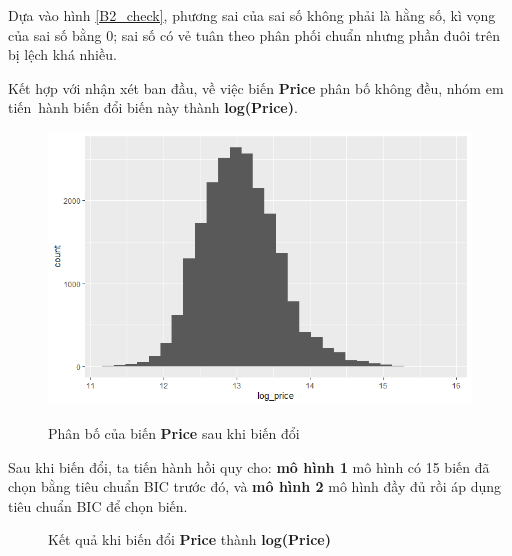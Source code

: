  Dựa vào hình \ref{B2_check}, phương sai của sai số không phải là hằng số, kì vọng của sai số bằng 0; sai số có vẻ tuân theo phân phối chuẩn nhưng phần đuôi trên bị lệch khá nhiều. 
 
 Kết hợp với nhận xét ban đầu, về việc biến \textbf{Price} phân bố không đều, nhóm em tiến~hành biến đổi biến này thành \textbf{log(Price)}.
 
 \begin{figure}[H]
 	\centering
 	{\includegraphics[width=.5\linewidth]{../Photo Of Result/B2_logprice}}
 	\caption{Phân bố của biến \textbf{Price} sau khi biến đổi }
 	\label{B2_log}
 \end{figure}
 Sau khi biến đổi, ta tiến hành hồi quy cho: \textbf{mô hình 1} mô hình có 15 biến đã chọn bằng tiêu chuẩn BIC trước đó, và \textbf{mô hình 2} mô hình đầy đủ rồi áp dụng tiêu chuẩn BIC để chọn biến.
 
  \begin{figure}[H]
 	\centering
 	\hfill
 	\caption{Kết quả khi biến đổi \textbf{Price} thành \textbf{log(Price)}}
 \end{figure}
 
